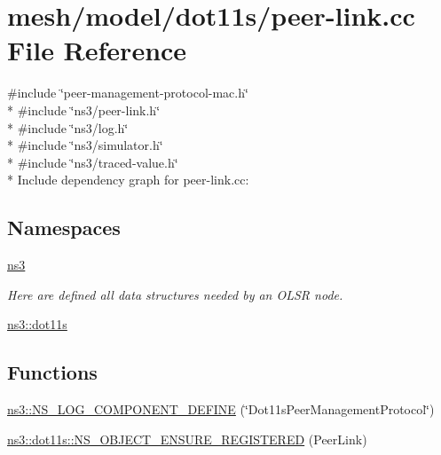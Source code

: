 \hypertarget{peer-link_8cc}{}\section{mesh/model/dot11s/peer-\/link.cc File Reference}
\label{peer-link_8cc}
{\ttfamily \#include \char`\"{}peer-\/management-\/protocol-\/mac.\+h\char`\"{}}\\*
{\ttfamily \#include \char`\"{}ns3/peer-\/link.\+h\char`\"{}}\\*
{\ttfamily \#include \char`\"{}ns3/log.\+h\char`\"{}}\\*
{\ttfamily \#include \char`\"{}ns3/simulator.\+h\char`\"{}}\\*
{\ttfamily \#include \char`\"{}ns3/traced-\/value.\+h\char`\"{}}\\*
Include dependency graph for peer-\/link.cc\+:
\subsection*{Namespaces}
\begin{DoxyCompactItemize}
\item 
 \hyperlink{namespacens3}{ns3}
\begin{DoxyCompactList}\small\item\em Here are defined all data structures needed by an O\+L\+SR node. \end{DoxyCompactList}\item 
 \hyperlink{namespacens3_1_1dot11s}{ns3\+::dot11s}
\end{DoxyCompactItemize}
\subsection*{Functions}
\begin{DoxyCompactItemize}
\item 
\hyperlink{namespacens3_a39a75276809814efc8c86e238d18650c}{ns3\+::\+N\+S\+\_\+\+L\+O\+G\+\_\+\+C\+O\+M\+P\+O\+N\+E\+N\+T\+\_\+\+D\+E\+F\+I\+NE} (\char`\"{}Dot11s\+Peer\+Management\+Protocol\char`\"{})
\item 
\hyperlink{namespacens3_1_1dot11s_ab34b3d1bf4b909da6885f97d23c17d2a}{ns3\+::dot11s\+::\+N\+S\+\_\+\+O\+B\+J\+E\+C\+T\+\_\+\+E\+N\+S\+U\+R\+E\+\_\+\+R\+E\+G\+I\+S\+T\+E\+R\+ED} (Peer\+Link)
\end{DoxyCompactItemize}
